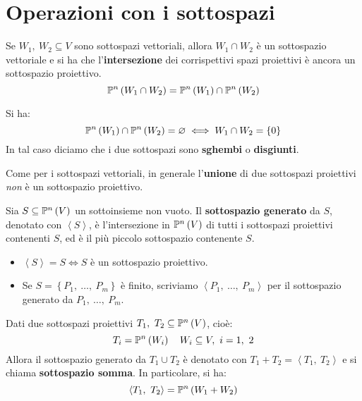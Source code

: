 \section{Operazioni con i sottospazi}
Se $W_1,\ W_2\subseteq V$ sono sottospazi vettoriali, allora $W_1\cap W_2$ è un sottospazio vettoriale e si ha che l'\textbf{intersezione} dei corrispettivi spazi proiettivi è ancora un sottospazio proiettivo.
\begin{equation*}
	\proj{W_1\cap W_2}=\proj{W_1}\cap\proj{W_2}
\end{equation*}
\begin{observe}
	Si ha:
	\begin{equation*}
		\proj{W_1}\cap\proj{W_2}=\emptyset\iff W_1\cap W_2=\left\{0\right\}
	\end{equation*}
In tal caso diciamo che i due sottospazi sono \textbf{sghembi} o \textbf{disgiunti}.
\end{observe}
Come per i sottospazi vettoriali, in generale l'\textbf{unione} di due sottospazi proiettivi \textit{non} è un sottospazio proiettivo.
\begin{define}
	Sia $S\subseteq \proj{V}$ un sottoinsieme non vuoto. Il \textbf{sottospazio generato} da $S$, denotato con $\left<S\right>$, è l'intersezione in $\proj{V}$ di tutti i sottospazi proiettivi contenenti $S$, ed è il più piccolo sottospazio contenente $S$.
\end{define}
\begin{itemize}
	\item $\left<S\right>=S\iff S$ è un sottospazio proiettivo.
	\item Se $S=\left\{P_1,\ \ldots,\ P_m\right\}$ è finito, scriviamo $\left<P_1,\ \ldots,\ P_m\right>$ per il sottospazio generato da $P_1,\ \ldots,\ P_m$.
\end{itemize}
\begin{define}
	Dati due sottospazi proiettivi $T_1,\ T_2\subseteq \proj{V}$, cioè:
	\begin{equation*}
		T_i=\proj{W_i}\quad W_i\subseteq V,\ i=1,\ 2
	\end{equation*}
	Allora il sottospazio generato da $T_1\cup T_2$ è denotato con $T_1+T_2=\left<T_1,\ T_2\right>$ e si chiama \textbf{sottospazio somma}. In particolare, si ha:
	\begin{equation}
		\left<T_1,\ T_2\right>=\proj{W_1+W_2}
	\end{equation}
\end{define}
